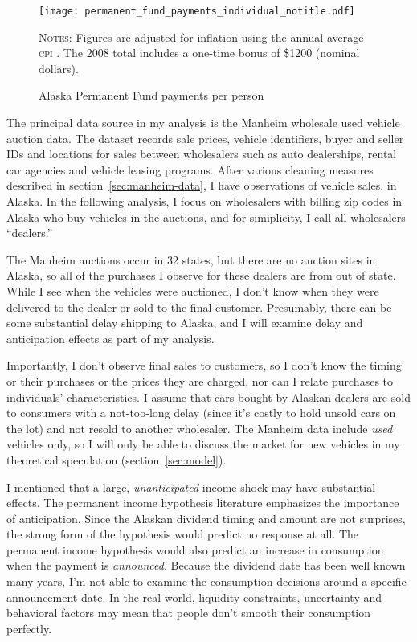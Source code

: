 \documentclass[11pt,letterpaper,oneside]{article}
\newcommand{\snippet}[1]{\hspace{-0.15em}}
\begin{document}
\begin{doublespacing}
\begin{figure}[bht]
    \caption{\large Alaska Permanent Fund payments per person}
    \label{fig:permanent-fund-payments-individual}
    \texttt{[image: permanent\_fund\_payments\_individual\_notitle.pdf]}

\noindent\textsc{Notes:}
		Figures are adjusted for inflation using the annual average \textsc{cpi} \parencite{fred_inflation}.
		The 2008 total includes a one-time bonus of \$1200 (nominal dollars).
\end{figure}

The principal data source in my analysis is the Manheim wholesale used vehicle auction data.
The dataset records sale prices, vehicle identifiers, buyer and seller IDs and locations for sales between wholesalers such as auto dealerships, rental car agencies and vehicle leasing programs.
After various cleaning measures described in section~\ref{sec:manheim-data}, I have
\snippet{auctions_cleaned_total_obs_count.tex}
observations of vehicle sales,
\snippet{auctions_cleaned_alaska_obs_count.tex} in Alaska.
In the following analysis, I focus on wholesalers with billing zip codes in Alaska who buy vehicles in the auctions, and for simiplicity, I call all wholesalers ``dealers.''

The Manheim auctions occur in 32 states, but there are no auction sites in Alaska, so all of the purchases I observe for these dealers are from out of state.
While I see when the vehicles were auctioned, I don't know when they were delivered to the dealer or sold to the final customer.
Presumably, there can be some substantial delay shipping to Alaska, and I will examine delay and anticipation effects as part of my analysis.

Importantly, I don't observe final sales to customers, so I don't know the timing or their purchases or the prices they are charged, nor can I relate purchases to individuals' characteristics.
I assume that cars bought by Alaskan dealers are sold to consumers with a not\hyp{}too\hyp{}long delay (since it's costly to hold unsold cars on the lot) and not resold to another wholesaler.
The Manheim data include \emph{used} vehicles only, so I will only be able to discuss the market for new vehicles in my theoretical speculation (section~\ref{sec:model}).


I mentioned that a large, \emph{unanticipated} income shock may have substantial effects.
The permanent income hypothesis literature emphasizes the importance of anticipation.
Since the Alaskan dividend timing and amount are not surprises, the strong form of the hypothesis would predict no response at all.
The permanent income hypothesis would also predict an increase in consumption when the payment is \emph{announced}.
Because the dividend date has been well known many years, I'm not able to examine the consumption decisions around a specific announcement date.
In the real world, liquidity constraints, uncertainty and behavioral factors may mean that people don't smooth their consumption perfectly.


\end{doublespacing}
\end{document}
